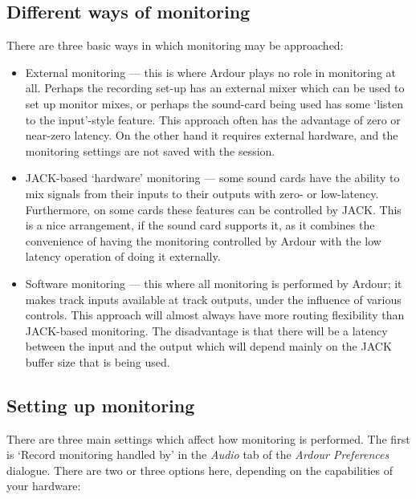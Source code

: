 \documentclass[10pt,a4paper]{book}
\begin{document}
\subsection{Different ways of monitoring}

There are three basic ways in which monitoring may be approached:

\begin{itemize}
\item External monitoring --- this is where Ardour plays no role in
  monitoring at all.  Perhaps the recording set-up has an external
  mixer which can be used to set up monitor mixes, or perhaps the
  sound-card being used has some `listen to the input'-style feature.
  This approach often has the advantage of zero or near-zero latency.
  On the other hand it requires external hardware, and the monitoring
  settings are not saved with the session.


\item JACK-based `hardware' monitoring --- some sound cards have the
  ability to mix signals from their inputs to their outputs with zero-
  or low-latency.  Furthermore, on some cards these features can be
  controlled by JACK\@.  This is a nice arrangement, if the sound card
  supports it, as it combines the convenience of having the monitoring
  controlled by Ardour with the low latency operation of doing it
  externally.

\item Software monitoring --- this where all monitoring is performed
  by Ardour; it makes track inputs available at track outputs, under
  the influence of various controls.  This approach will almost always
  have more routing flexibility than JACK-based monitoring.  The
  disadvantage is that there will be a latency between the input and
  the output which will depend mainly on the JACK buffer size that is
  being used.

\end{itemize}

\subsection{Setting up monitoring}

There are three main settings which affect how monitoring is
performed.  The first is `Record monitoring handled by' in the
\emph{Audio} tab of the \emph{Ardour Preferences} dialogue.  There are
two or three options here, depending on the capabilities of your
hardware:
\end{document}
